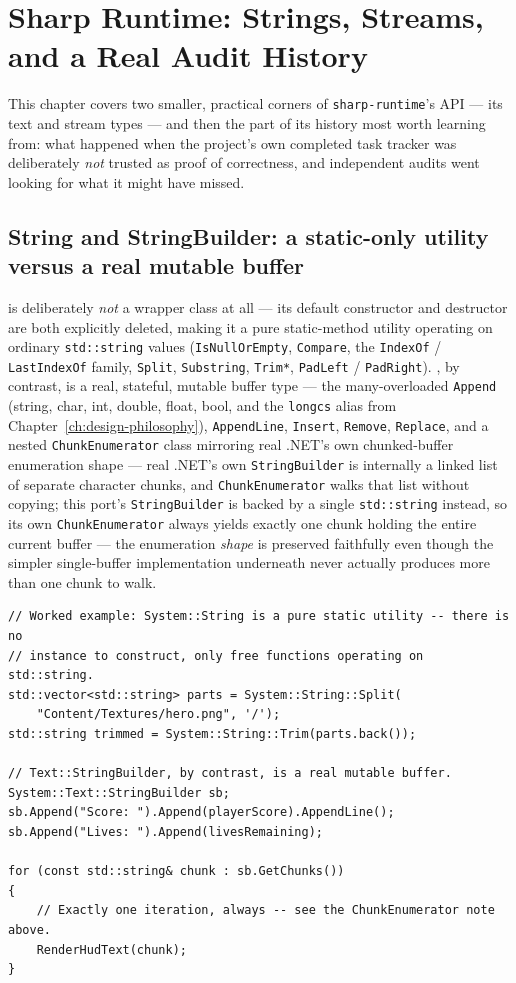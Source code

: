 \chapter{Sharp Runtime: Strings, Streams, and a Real Audit History}
\label{ch:sharp-runtime-namespaces}

This chapter covers two smaller, practical corners of \texttt{sharp-runtime}'s API --- its
text and stream types --- and then the part of its history most worth learning from: what
happened when the project's own completed task tracker was deliberately \emph{not} trusted as
proof of correctness, and independent audits went looking for what it might have missed.

\section{String and StringBuilder: a static-only utility versus a real mutable buffer}

 is deliberately \emph{not} a wrapper class at all --- its default
constructor and destructor are both explicitly deleted, making it a pure static-method utility
operating on ordinary \texttt{std::string} values (\texttt{IsNullOrEmpty}, \texttt{Compare},
the \texttt{IndexOf} / \texttt{LastIndexOf} family, \texttt{Split}, \texttt{Substring},
\texttt{Trim*}, \texttt{PadLeft} / \texttt{PadRight}). , by
contrast, is a real, stateful, mutable buffer type --- the many-overloaded \texttt{Append}
(string, char, int, double, float, bool, and the \texttt{longcs} alias from
Chapter~\ref{ch:design-philosophy}), \texttt{AppendLine}, \texttt{Insert},
\texttt{Remove}, \texttt{Replace}, and a nested \texttt{ChunkEnumerator} class mirroring real
.NET's own chunked-buffer enumeration shape --- real .NET's own \texttt{StringBuilder} is
internally a linked list of separate character chunks, and \texttt{ChunkEnumerator} walks that
list without copying; this port's \texttt{StringBuilder} is backed by a single
\texttt{std::string} instead, so its own \texttt{ChunkEnumerator} always yields exactly one
chunk holding the entire current buffer --- the enumeration \emph{shape} is preserved
faithfully even though the simpler single-buffer implementation underneath never actually
produces more than one chunk to walk.

\begin{lstlisting}
// Worked example: System::String is a pure static utility -- there is no
// instance to construct, only free functions operating on std::string.
std::vector<std::string> parts = System::String::Split(
    "Content/Textures/hero.png", '/');
std::string trimmed = System::String::Trim(parts.back());

// Text::StringBuilder, by contrast, is a real mutable buffer.
System::Text::StringBuilder sb;
sb.Append("Score: ").Append(playerScore).AppendLine();
sb.Append("Lives: ").Append(livesRemaining);

for (const std::string& chunk : sb.GetChunks())
{
    // Exactly one iteration, always -- see the ChunkEnumerator note above.
    RenderHudText(chunk);
}
\end{lstlisting}


